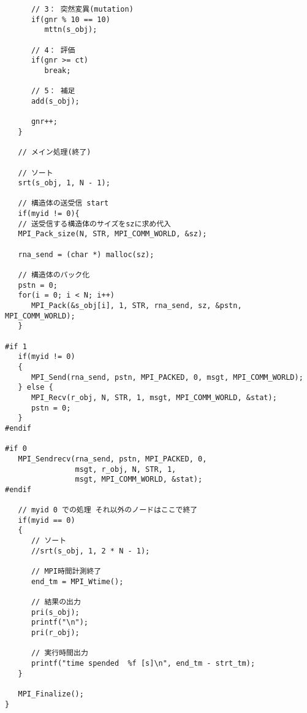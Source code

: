 \documentclass[a4paper,titlepage]{jreport}
\begin{document}
\begin{verbatim}
      // 3： 突然変異(mutation)
      if(gnr % 10 == 10)
         mttn(s_obj);

      // 4： 評価
      if(gnr >= ct)
         break;

      // 5： 補足
      add(s_obj);

      gnr++;
   }

   // メイン処理(終了)

   // ソート
   srt(s_obj, 1, N - 1);

   // 構造体の送受信 start
   if(myid != 0){
   // 送受信する構造体のサイズをszに求め代入
   MPI_Pack_size(N, STR, MPI_COMM_WORLD, &sz);

   rna_send = (char *) malloc(sz);

   // 構造体のパック化
   pstn = 0;
   for(i = 0; i < N; i++)
      MPI_Pack(&s_obj[i], 1, STR, rna_send, sz, &pstn, MPI_COMM_WORLD);
   }
  
#if 1
   if(myid != 0)
   {
      MPI_Send(rna_send, pstn, MPI_PACKED, 0, msgt, MPI_COMM_WORLD);
   } else {
      MPI_Recv(r_obj, N, STR, 1, msgt, MPI_COMM_WORLD, &stat);
      pstn = 0;
   }
#endif

#if 0
   MPI_Sendrecv(rna_send, pstn, MPI_PACKED, 0,
                msgt, r_obj, N, STR, 1,
                msgt, MPI_COMM_WORLD, &stat);
#endif

   // myid 0 での処理 それ以外のノードはここで終了
   if(myid == 0)
   {
      // ソート
      //srt(s_obj, 1, 2 * N - 1);

      // MPI時間計測終了
      end_tm = MPI_Wtime();
   
      // 結果の出力
      pri(s_obj);
      printf("\n");
      pri(r_obj);

      // 実行時間出力
      printf("time spended  %f [s]\n", end_tm - strt_tm);
   }

   MPI_Finalize();
}
\end{verbatim}
\end{document}
